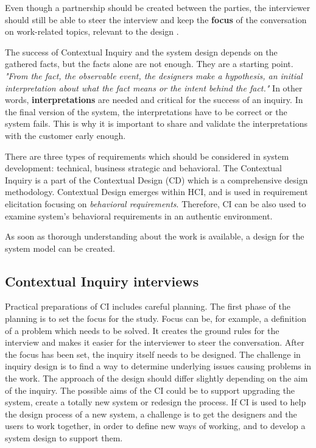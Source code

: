 \documentclass[12pt,a4paper,oneside,pdftex]{report}
\begin{document}
Even though a partnership should be created between the parties, the interviewer should still be able to steer the interview and keep the \textbf{focus} of the conversation on work-related topics, relevant to the design \citep{RefWorks:21}. 

The success of Contextual Inquiry and the system design depends on the gathered facts, but the facts alone are not enough. They are a starting point. \textit{"From the fact, the observable event, the designers make a hypothesis, an initial interpretation about what the fact means or the intent behind the fact."}\citep{RefWorks:21} In other words, \textbf{interpretations} are needed and critical for the success of an inquiry. In the final version of the system, the interpretations have to be correct or the system fails. This is why it is important to share and validate the interpretations with the customer early enough. \citep{RefWorks:21}

There are three types of requirements which should be considered in system development: technical, business strategic and behavioral. The Contextual Inquiry is a part of the Contextual Design (CD) which is a comprehensive design methodology. Contextual Design emerges within HCI, and is used in requirement elicitation focusing on \emph{behavioral requirements}. Therefore, CI can be also used to examine system's behavioral requirements in an authentic environment. \citep{RefWorks:33, RefWorks:36}

As soon as thorough understanding about the work is available, a design for the system model can be created.\citep{RefWorks:14} 

\subsection{Contextual Inquiry interviews}

Practical preparations of CI includes careful planning. The first phase of the planning is to set the focus for the study. Focus can be, for example, a definition of a problem which needs to be solved. It creates the ground rules for the interview and makes it easier for the interviewer to steer the conversation. After the focus has been set, the inquiry itself needs to be designed. The challenge in inquiry design is to find a way to determine underlying issues causing problems in the work. The approach of the design should differ slightly depending on the aim of the inquiry. The possible aims of the CI could be to support upgrading the system, create a totally new system or redesign the process. If CI is used to help the design process of a new system, a challenge is to get the designers and the users to work together, in order to define new ways of working, and to develop a system design to support them. \citep{RefWorks:21} 
\end{document}
